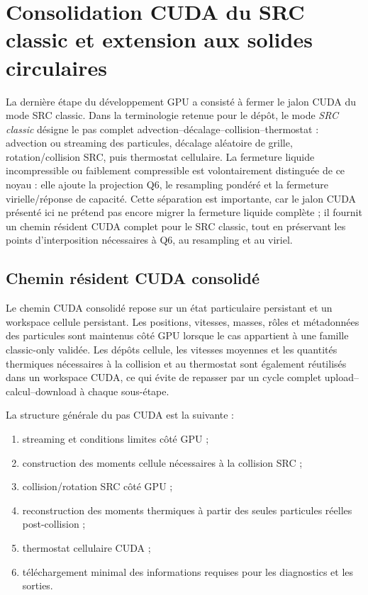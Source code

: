 \documentclass[11pt,a4paper]{article}
\begin{document}
\section{Consolidation CUDA du SRC classic et extension aux solides circulaires}
\label{sec:cuda-src-classic-circle-0286}

La dernière étape du développement GPU a consisté à fermer le jalon CUDA du mode SRC classic. Dans la terminologie retenue pour le dépôt, le mode \emph{SRC classic} désigne le pas complet advection--décalage--collision--thermostat : advection ou streaming des particules, décalage aléatoire de grille, rotation/collision SRC, puis thermostat cellulaire. La fermeture liquide incompressible ou faiblement compressible est volontairement distinguée de ce noyau : elle ajoute la projection Q6, le resampling pondéré et la fermeture virielle/réponse de capacité. Cette séparation est importante, car le jalon CUDA présenté ici ne prétend pas encore migrer la fermeture liquide complète ; il fournit un chemin résident CUDA complet pour le SRC classic, tout en préservant les points d'interposition nécessaires à Q6, au resampling et au viriel.

\subsection{Chemin résident CUDA consolidé}

Le chemin CUDA consolidé repose sur un état particulaire persistant et un workspace cellule persistant. Les positions, vitesses, masses, rôles et métadonnées des particules sont maintenus côté GPU lorsque le cas appartient à une famille classic-only validée. Les dépôts cellule, les vitesses moyennes et les quantités thermiques nécessaires à la collision et au thermostat sont également réutilisés dans un workspace CUDA, ce qui évite de repasser par un cycle complet upload--calcul--download à chaque sous-étape.

La structure générale du pas CUDA est la suivante :

\begin{enumerate}
  \item streaming et conditions limites côté GPU ;
  \item construction des moments cellule nécessaires à la collision SRC ;
  \item collision/rotation SRC côté GPU ;
  \item reconstruction des moments thermiques à partir des seules particules réelles post-collision ;
  \item thermostat cellulaire CUDA ;
  \item téléchargement minimal des informations requises pour les diagnostics et les sorties.
\end{enumerate}
\end{document}
